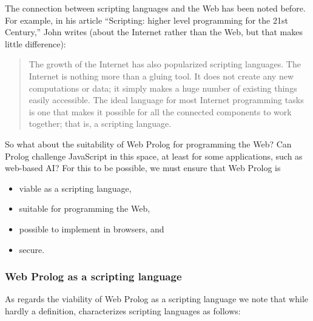 %
%

The connection between scripting languages and the Web has been noted before. For example, in his article ``Scripting: higher level programming for the 21st Century,'' John \citet{660187} writes (about the Internet rather than the Web, but that makes little difference):

\begin{quote}
The growth of the Internet has also popularized scripting languages. The Internet is nothing more than a gluing tool. It does not create any new computations or data; it simply makes a huge number of existing things easily accessible. The ideal language for most Internet programming tasks is one that makes it possible for all the connected components to work together; that is, a scripting language.
\end{quote}

\noindent So what about the suitability of Web Prolog for programming the Web? Can Prolog challenge JavaScript in this space, at least for some applications, such as web-based AI? For this to be possible, we must ensure that Web Prolog is

\begin{itemize}
\item viable as a scripting language,
\item suitable for programming the Web, 
\item possible to implement in browsers, and
\item secure. 
\end{itemize}

\subsubsection{Web Prolog as a scripting language}\label{sec:web-prolog-as-a-scripting-language-1}

\noindent As regards the viability of Web Prolog as a scripting language we note that while hardly a definition, \citet{660187} characterizes scripting languages as follows:

